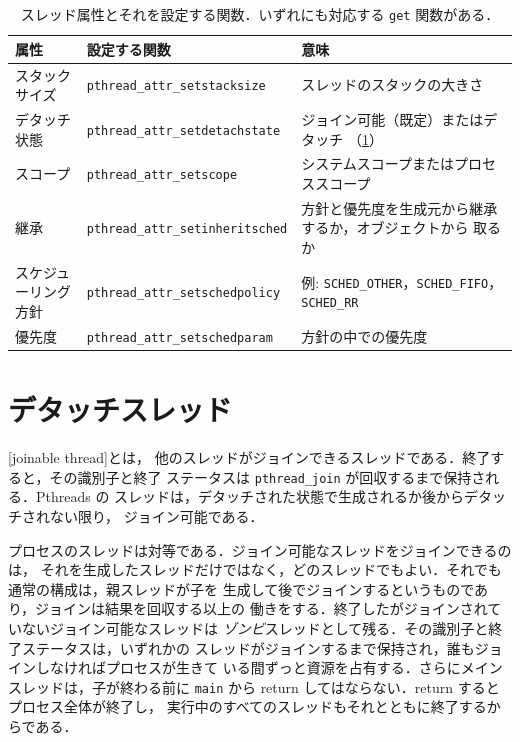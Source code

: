 \documentclass[../main.tex]{subfiles}
\begin{document}
\begin{table}[htbp]
  \centering
  \caption{スレッド属性とそれを設定する関数．いずれにも対応する
    \texttt{get} 関数がある．}
  \label{tab:l04-attributes}
  \small
  \setlength{\tabcolsep}{4pt}
  \begin{tabular}{@{}>{\RaggedRight}p{24mm}l>{\RaggedRight\arraybackslash}p{36mm}@{}}
    \toprule
    属性 & 設定する関数 & 意味 \\
    \midrule
    スタックサイズ & \texttt{pthread\_attr\_setstacksize}
                 & スレッドのスタックの大きさ \\
    デタッチ状態 & \texttt{pthread\_attr\_setdetachstate}
                 & ジョイン可能（既定）またはデタッチ
                   （\cref{sec:l04-detached}） \\
    スコープ     & \texttt{pthread\_attr\_setscope}
                 & システムスコープまたはプロセススコープ \\
    継承         & \texttt{pthread\_attr\_setinheritsched}
                 & 方針と優先度を生成元から継承するか，オブジェクトから
                   取るか \\
    スケジューリング方針 & \texttt{pthread\_attr\_setschedpolicy}
                 & 例: \texttt{SCHED\_OTHER}，\texttt{SCHED\_FIFO}，
                   \texttt{SCHED\_RR} \\
    優先度       & \texttt{pthread\_attr\_setschedparam}
                 & 方針の中での優先度 \\
    \bottomrule
  \end{tabular}
\end{table}

\section{デタッチスレッド}
\label{sec:l04-detached}

\begin{definition}[ジョイン可能スレッド]
  [joinable thread]とは，
  他のスレッドがジョインできるスレッドである．終了すると，その識別子と終了
  ステータスは \texttt{pthread\_join} が回収するまで保持される．Pthreads の
  スレッドは，デタッチされた状態で生成されるか後からデタッチされない限り，
  ジョイン可能である．
\end{definition}

プロセスのスレッドは対等である．ジョイン可能なスレッドをジョインできるのは，
それを生成したスレッドだけではなく，どのスレッドでもよい．それでも通常の構成は，親スレッドが子を
生成して後でジョインするというものであり，ジョインは結果を回収する以上の
働きをする．終了したがジョインされていないジョイン可能なスレッドは
\emph{ゾンビ}スレッドとして残る．その識別子と終了ステータスは，いずれかの
スレッドがジョインするまで保持され，誰もジョインしなければプロセスが生きて
いる間ずっと資源を占有する．さらにメインスレッドは，子が終わる前に
\texttt{main} から return してはならない．return するとプロセス全体が終了し，
実行中のすべてのスレッドもそれとともに終了するからである．
\end{document}
